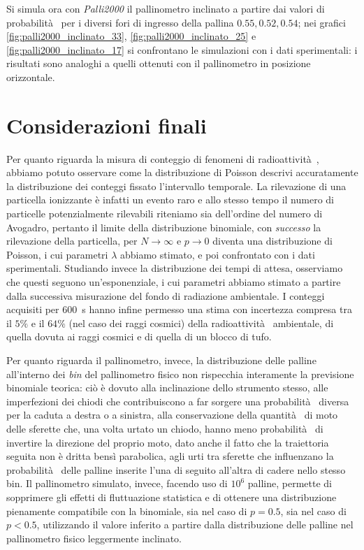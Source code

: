\documentclass[10pt,oneside,a4paper]{article}
\begin{document}
Si simula ora con \emph{Palli2000} il pallinometro inclinato a partire dai valori di probabilità  per i diversi fori di ingresso della pallina $0.55, 0.52, 0.54$; nei grafici \ref{fig:palli2000_inclinato_33}, \ref{fig:palli2000_inclinato_25} e \ref{fig:palli2000_inclinato_17} si confrontano le simulazioni con i dati sperimentali: i risultati sono analoghi a quelli ottenuti con il pallinometro in posizione orizzontale.

\section{Considerazioni finali}
Per quanto riguarda la misura di conteggio di fenomeni di radioattività , abbiamo potuto osservare come la distribuzione di Poisson descrivi accuratamente la distribuzione dei conteggi fissato l'intervallo temporale. La rilevazione di una particella ionizzante è infatti un evento raro e allo stesso tempo il numero di particelle potenzialmente rilevabili riteniamo sia dell'ordine del numero di Avogadro, pertanto il limite della distribuzione binomiale, con \emph{successo} la rilevazione della particella, per $N \rightarrow \infty$ e $p \rightarrow 0$ diventa una distribuzione di Poisson, i cui parametri $\lambda$ abbiamo stimato, e poi confrontato con i dati sperimentali. Studiando invece la distribuzione dei tempi di attesa, osserviamo che questi seguono un'esponenziale, i cui parametri abbiamo stimato a partire dalla successiva misurazione del fondo di radiazione ambientale. I conteggi acquisiti per \SI{600}{s} hanno infine permesso una stima con incertezza compresa tra il $5\%$ e il $64\%$ (nel caso dei raggi cosmici) della radioattività  ambientale, di quella dovuta ai raggi cosmici e di quella di un blocco di tufo.

Per quanto riguarda il pallinometro, invece, la distribuzione delle palline all'interno dei \emph{bin} del pallinometro fisico non rispecchia interamente la previsione binomiale teorica: ciò è dovuto alla inclinazione dello strumento stesso, alle imperfezioni dei chiodi che contribuiscono a far sorgere una probabilità  diversa per la caduta a destra o a sinistra, alla conservazione della quantità  di moto delle sferette che, una volta urtato un chiodo, hanno meno probabilità  di invertire la direzione del proprio moto, dato anche il fatto che la traiettoria seguita non è dritta bensì parabolica, agli urti tra sferette che influenzano la probabilità  delle palline inserite l'una di seguito all'altra di cadere nello stesso bin. Il pallinometro simulato, invece, facendo uso di $10^6$ palline, permette di sopprimere gli effetti di fluttuazione statistica e di ottenere una distribuzione pienamente compatibile con la binomiale, sia nel caso di $p = 0.5$, sia nel caso di $p<0.5$, utilizzando il valore inferito a partire dalla distribuzione delle palline nel pallinometro fisico leggermente inclinato. 
\end{document}
